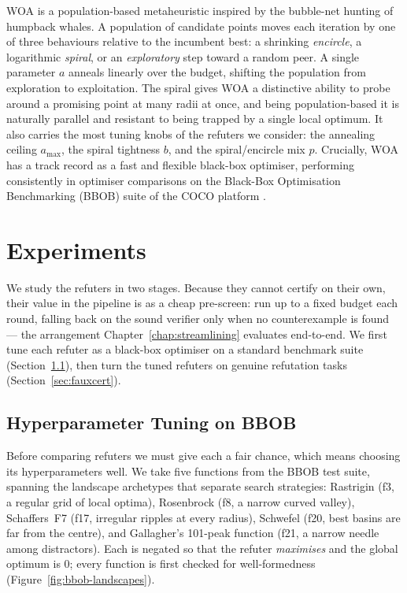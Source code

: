 WOA \cite{whale_oa} is a population-based metaheuristic inspired by the bubble-net hunting of
humpback whales. A population of candidate points moves each iteration by one of
three behaviours relative to the incumbent best: a shrinking \emph{encircle}, a
logarithmic \emph{spiral}, or an \emph{exploratory} step toward a random peer. A single parameter $a$ anneals
linearly over the budget, shifting the population from exploration to
exploitation. The spiral gives WOA a distinctive ability to probe around a
promising point at many radii at once, and being population-based it is
naturally parallel and resistant to being trapped by a single local optimum. It
also carries the most tuning knobs of the refuters we consider: the annealing
ceiling $a_{\max}$, the spiral tightness $b$, and the spiral/encircle mix $p$.
Crucially, WOA has a track record as a fast and flexible black-box optimiser,
performing consistently in optimiser comparisons on the Black-Box Optimisation
Benchmarking (BBOB) suite of the COCO platform \cite{hansen2021coco}.

\section{Experiments}

We study the refuters in two stages. Because they cannot certify on their own,
their value in the pipeline is as a cheap pre-screen: run up to a fixed budget
each round, falling back on the sound verifier only when no counterexample is
found --- the arrangement Chapter~\ref{chap:streamlining} evaluates
end-to-end. We first tune each refuter as a black-box optimiser on a standard benchmark suite
(Section~\ref{sec:bbob}), then turn the tuned refuters on genuine refutation
tasks (Section~\ref{sec:fauxcert}).

\subsection{Hyperparameter Tuning on BBOB}
\label{sec:bbob}

Before comparing refuters we must give each a fair chance, which means choosing
its hyperparameters well. We take five functions from the BBOB test suite, spanning
the landscape archetypes that separate search strategies: Rastrigin (f3, a
regular grid of local optima), Rosenbrock (f8, a narrow curved valley),
Schaffers~F7 (f17, irregular ripples at every radius), Schwefel (f20, best basins are far from the centre), and
Gallagher's 101-peak function (f21, a narrow needle among distractors). Each is
negated so that the refuter \emph{maximises} and the global optimum is $0$; every
function is first checked for well-formedness (Figure~\ref{fig:bbob-landscapes}).




